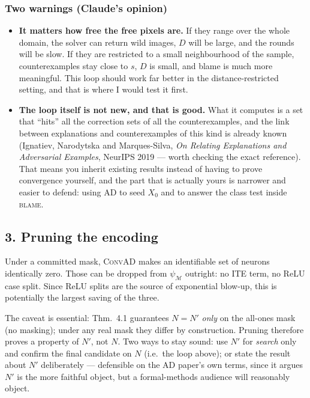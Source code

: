 \documentclass[11pt,a4paper]{article}
\newcommand{\convad}{\textsc{ConvAD}}
\newcommand{\ad}{\textsc{AD}}
\begin{document}
\subsubsection*{Two warnings (Claude's opinion)}

\begin{itemize}[leftmargin=1.2em]
\item \textbf{It matters how free the free pixels are.} If they range over the
whole domain, the solver can return wild images, $D$ will be large, and the
rounds will be slow. If they are restricted to a small neighbourhood of the
sample, counterexamples stay close to $s$, $D$ is small, and blame is much more
meaningful. This loop should work far better in the distance-restricted setting,
and that is where I would test it first.

\item \textbf{The loop itself is not new, and that is good.} What it computes is
a set that ``hits'' all the correction sets of all the counterexamples, and the
link between explanations and counterexamples of this kind is already known
(Ignatiev, Narodytska and Marques-Silva, \emph{On Relating Explanations and
Adversarial Examples}, NeurIPS 2019 --- worth checking the exact reference).
That means you inherit existing results instead of having to prove convergence
yourself, and the part that is actually yours is narrower and easier to defend:
using \ad{} to seed $X_0$ and to answer the class test inside \textsc{blame}.
\end{itemize}


\subsection*{3. Pruning the encoding}

Under a committed mask, \convad{} makes an identifiable set of neurons
identically zero. Those can be dropped from $\psi_{\mathcal{M}}$ outright: no
ITE term, no ReLU case split. Since ReLU splits are the source of exponential
blow-up, this is potentially the largest saving of the three.

The caveat is essential: Thm.~4.1 guarantees $N = N'$ \emph{only} on the
all-ones mask (no masking); under any real mask they differ by construction. Pruning
therefore proves a property of $N'$, not $N$. Two ways to stay sound: use $N'$
for \emph{search} only and confirm the final candidate on $N$ (i.e.\ the loop
above); or state the result about $N'$ deliberately --- defensible on the \ad{}
paper's own terms, since it argues $N'$ is the more faithful object, but a
formal-methods audience will reasonably object.
\end{document}
